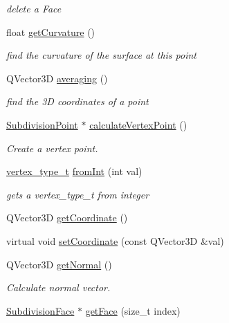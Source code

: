 \begin{DoxyCompactItemize}
\begin{DoxyCompactList}\small\item\em delete a Face \end{DoxyCompactList}\item 
float \hyperlink{classShipCAD_1_1SubdivisionPoint_aa07a859d70f97e57fc5318fc64a9d897}{get\-Curvature} ()
\begin{DoxyCompactList}\small\item\em find the curvature of the surface at this point \end{DoxyCompactList}\item 
Q\-Vector3\-D \hyperlink{classShipCAD_1_1SubdivisionPoint_a0c9e47af796dacd9542d065bbd0d0fcf}{averaging} ()
\begin{DoxyCompactList}\small\item\em find the 3\-D coordinates of a point \end{DoxyCompactList}\item 
\hyperlink{classShipCAD_1_1SubdivisionPoint}{Subdivision\-Point} $\ast$ \hyperlink{classShipCAD_1_1SubdivisionPoint_a92632ddbe28fb6901e445b60eab8d3ee}{calculate\-Vertex\-Point} ()
\begin{DoxyCompactList}\small\item\em Create a vertex point. \end{DoxyCompactList}\item 
\hyperlink{namespaceShipCAD_a03171cc921c53a568b778f5131a60deb}{vertex\-\_\-type\-\_\-t} \hyperlink{classShipCAD_1_1SubdivisionPoint_ad6ef4b07ee0d97756395c7bac4082f42}{from\-Int} (int val)
\begin{DoxyCompactList}\small\item\em gets a vertex\-\_\-type\-\_\-t from integer \end{DoxyCompactList}\item 
Q\-Vector3\-D \hyperlink{classShipCAD_1_1SubdivisionPoint_a0cf49d3e181eb00c08119721b33275bc}{get\-Coordinate} ()
\item 
virtual void \hyperlink{classShipCAD_1_1SubdivisionPoint_a98ab99a0ccc4709a40e05b36147c0f55}{set\-Coordinate} (const Q\-Vector3\-D \&val)
\item 
Q\-Vector3\-D \hyperlink{classShipCAD_1_1SubdivisionPoint_a8dd5facd4006480baea4a7f4487094f5}{get\-Normal} ()
\begin{DoxyCompactList}\small\item\em Calculate normal vector. \end{DoxyCompactList}\item 
\hyperlink{classShipCAD_1_1SubdivisionFace}{Subdivision\-Face} $\ast$ \hyperlink{classShipCAD_1_1SubdivisionPoint_a673d2a2c94f52e5523a012959417dcc3}{get\-Face} (size\-\_\-t index)

\end{DoxyCompactItemize}

